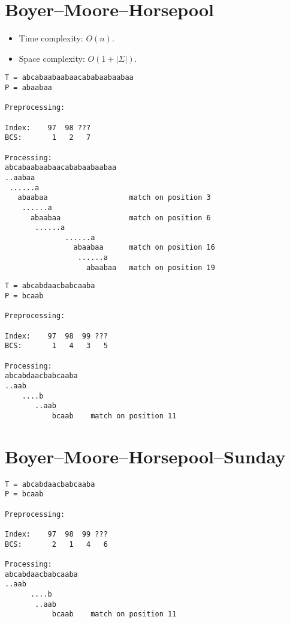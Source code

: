 
\section{Boyer--Moore--Horsepool}
\begin{itemize}
\item Time complexity: $O(n)$.
\item Space complexity: $O(1+|\Sigma|)$.
\end{itemize}

\begin{verbatim}
T = abcabaabaabaacababaabaabaa
P = abaabaa

Preprocessing:

Index:    97  98 ???
BCS:       1   2   7 

Processing:
abcabaabaabaacababaabaabaa
..aabaa
 ......a
   abaabaa                   match on position 3
    ......a
      abaabaa                match on position 6
       ......a
              ......a
                abaabaa      match on position 16
                 ......a
                   abaabaa   match on position 19
\end{verbatim}

\begin{verbatim}
T = abcabdaacbabcaaba 
P = bcaab

Preprocessing:

Index:    97  98  99 ???
BCS:       1   4   3   5 

Processing:
abcabdaacbabcaaba
..aab
    ....b
       ..aab
           bcaab    match on position 11
\end{verbatim}

\section{Boyer--Moore--Horsepool--Sunday}

\begin{verbatim}
T = abcabdaacbabcaaba 
P = bcaab

Preprocessing:

Index:    97  98  99 ???
BCS:       2   1   4   6 

Processing:
abcabdaacbabcaaba
..aab
      ....b
       ..aab
           bcaab    match on position 11
\end{verbatim}
